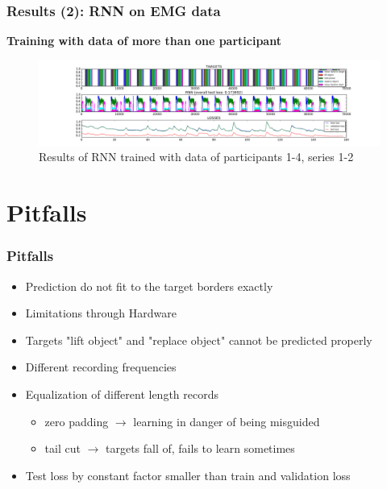 \documentclass{beamer}
\begin{document}
\begin{frame}
	\frametitle{Results (2): RNN on EMG data}
	\textbf{Training with data of more than one participant}
	\begin{figure}[ht]
		\centering
		\includegraphics[width=1.0\textwidth,trim={5cm 0cm 5cm 0cm},clip]{images/EMG-results_participant_1-4_series1-2.png}
		\caption{Results of RNN trained with data of participants 1-4, series 1-2}

	\end{figure}
\end{frame}

\section{Pitfalls}

\begin{frame}
	\frametitle{Pitfalls}
	\begin{itemize}
		\item Prediction do not fit to the target borders exactly
		\item Limitations through Hardware
		\item Targets "lift object" and "replace object" cannot be predicted properly
        \item Different recording frequencies
        \item Equalization of different length records
        \begin{itemize}
            \item zero padding $\rightarrow$ learning in danger of being misguided
            \item tail cut $\rightarrow$ targets fall of, fails to learn sometimes
        \end{itemize}
        \item Test loss by constant factor smaller than train and validation loss
	\end{itemize}
\end{frame}

\end{document}
